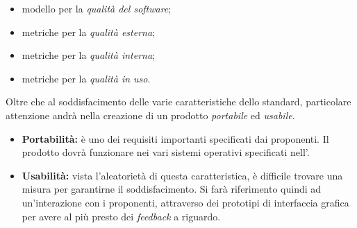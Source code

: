 \begin{itemize}
\item modello per la \textit{qualità del software};
\item metriche per la \textit{qualità esterna};
\item metriche per la \textit{qualità interna};
\item metriche per la \textit{qualità in uso}.
\end{itemize}
Oltre che al soddisfacimento delle varie caratteristiche dello standard, particolare attenzione andrà nella creazione di un prodotto \textit{portabile} ed \textit{usabile}.
\begin{itemize}
\item\textbf{Portabilità:} è uno dei requisiti importanti specificati dai proponenti. Il prodotto dovrà funzionare nei vari sistemi operativi\glossario{} specificati nell'\analisi{}.
\item\textbf{Usabilità:} vista l'aleatorietà di questa caratteristica, è difficile trovare una misura per garantirne il soddisfacimento. Si farà riferimento quindi ad un'interazione con i proponenti, attraverso dei prototipi di interfaccia grafica per avere al più presto dei \textit{feedback} a riguardo.
\end{itemize}


